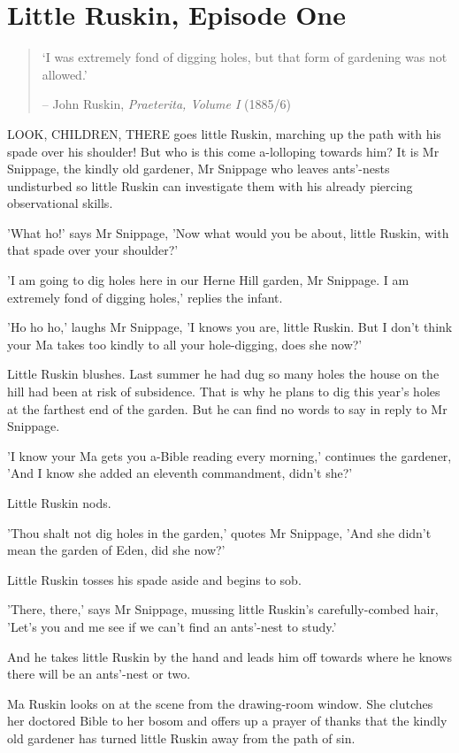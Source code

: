 \chapter{Little Ruskin, Episode One}

\begin{quotation}
`I was extremely fond of digging holes, but that form of gardening was not allowed.' 

-- John Ruskin, \emph{Praeterita, Volume I} (1885/6)
\end{quotation}

LOOK, CHILDREN, THERE goes little Ruskin, marching up the path with his spade over his shoulder! But who is this come a-lolloping towards him? It is Mr Snippage, the kindly old gardener, Mr Snippage who leaves ants'-nests undisturbed so little Ruskin can investigate them with his already piercing observational skills.

'What ho!' says Mr Snippage, 'Now what would you be about, little Ruskin, with that spade over your shoulder?'

'I am going to dig holes here in our Herne Hill garden, Mr Snippage. I am extremely fond of digging holes,' replies the infant.

'Ho ho ho,' laughs Mr Snippage, 'I knows you are, little Ruskin. But I don't think your Ma takes too kindly to all your hole-digging, does she now?'

Little Ruskin blushes. Last summer he had dug so many holes the house on the hill had been at risk of subsidence. That is why he plans to dig this year's holes at the farthest end of the garden. But he can find no words to say in reply to Mr Snippage.

'I know your Ma gets you a-Bible reading every morning,' continues the gardener, 'And I know she added an eleventh commandment, didn't she?'

Little Ruskin nods.

'Thou shalt not dig holes in the garden,' quotes Mr Snippage, 'And she didn't mean the garden of Eden, did she now?'

Little Ruskin tosses his spade aside and begins to sob.

'There, there,' says Mr Snippage, mussing little Ruskin's carefully-combed hair, 'Let's you and me see if we can't find an ants'-nest to study.'

And he takes little Ruskin by the hand and leads him off towards where he knows there will be an ants'-nest or two.

Ma Ruskin looks on at the scene from the drawing-room window. She clutches her doctored Bible to her bosom and offers up a prayer of thanks that the kindly old gardener has turned little Ruskin away from the path of sin.
